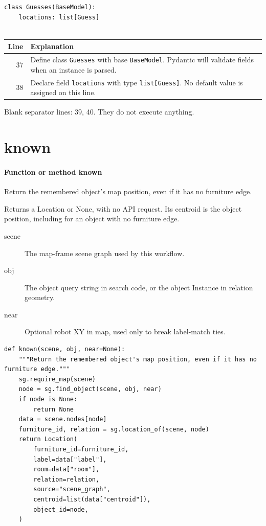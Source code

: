 \documentclass[11pt,a4paper]{book}
\begin{document}
\begin{lstlisting}[firstnumber=37]
class Guesses(BaseModel):
    locations: list[Guess]


\end{lstlisting}

\begin{longtable}{r p{}}

\textbf{Line} & \textbf{Explanation} \\ \hline \endhead

37 & Define class \texttt{Guesses} with base \texttt{BaseModel}. Pydantic will validate fields when an instance is parsed. \\

38 & Declare field \texttt{locations} with type \texttt{list[Guess]}. No default value is assigned on this line. \\

\end{longtable}

Blank separator lines: 39, 40. They do not execute anything.

\section{known}

\paragraph{Function or method known}
Return the remembered object's map position, even if it has no furniture edge.

Returns a Location or None, with no API request. Its centroid is the object position, including for an object with no furniture edge.

\begin{description}
\item[scene] The map-frame scene graph used by this workflow.
\item[obj] The object query string in search code, or the object Instance in relation geometry.
\item[near] Optional robot XY in map, used only to break label-match ties.
\end{description}

\begin{lstlisting}[firstnumber=41]
def known(scene, obj, near=None):
    """Return the remembered object's map position, even if it has no furniture edge."""
    sg.require_map(scene)
    node = sg.find_object(scene, obj, near)
    if node is None:
        return None
    data = scene.nodes[node]
    furniture_id, relation = sg.location_of(scene, node)
    return Location(
        furniture_id=furniture_id,
        label=data["label"],
        room=data["room"],
        relation=relation,
        source="scene_graph",
        centroid=list(data["centroid"]),
        object_id=node,
    )


\end{lstlisting}
\end{document}
